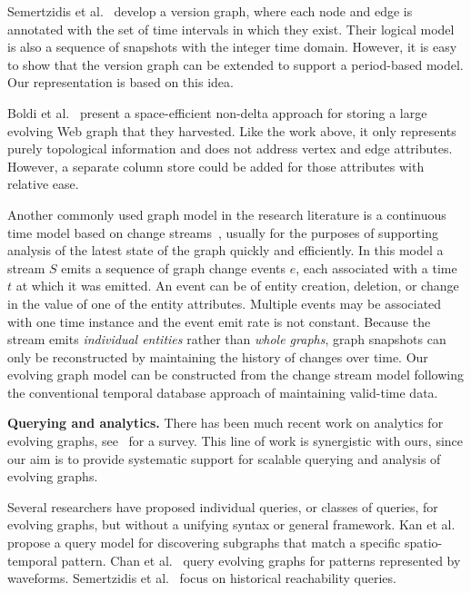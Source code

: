Semertzidis et al.~\cite{Semertzidis2015} develop a version graph,
where each node and edge is annotated with the set of time intervals
in which they exist.  Their logical model is also a sequence of
snapshots with the integer time domain.  However, it is easy to show
that the version graph can be extended to support a period-based
model.  Our \og representation is based on this idea.

Boldi et al.~\cite{Boldi2008} present a space-efficient non-delta
approach for storing a large evolving Web graph that they harvested.
Like the work above, it only represents purely topological information
and does not address vertex and edge attributes.  However, a separate
column store could be added for those attributes with relative ease.

Another commonly used graph model in the research literature is a
continuous time model based on change
streams~\cite{Cheng2012,Ediger2012}, usually for the purposes of
supporting analysis of the latest state of the graph quickly and
efficiently.  In this model a stream $S$ emits a sequence of graph
change events $e$, each associated with a time $t$ at which it was
emitted.  An event can be of entity creation, deletion, or change in
the value of one of the entity attributes.  Multiple events may be
associated with one time instance and the event emit rate is not
constant.  Because the stream emits {\em individual entities} rather
than {\em whole graphs}, graph snapshots can only be reconstructed by
maintaining the history of changes over time.  Our evolving graph
model can be constructed from the change stream model following
the conventional temporal database approach of maintaining valid-time data.


{\bf Querying and analytics.} There has been much recent work on
analytics for evolving graphs,
see~\cite{DBLP:journals/csur/AggarwalS14} for a survey. This line of
work is synergistic with ours, since our aim is to provide systematic
support for scalable querying and analysis of evolving graphs.

Several researchers have proposed individual queries, or classes of
queries, for evolving graphs, but without a unifying syntax or general
framework.  Kan et al.~\cite{Kan2009} propose a query model for
discovering subgraphs that match a specific spatio-temporal pattern.
Chan et al.~\cite{Chan2008} query evolving graphs for patterns
represented by waveforms.  Semertzidis et al.~\cite{Semertzidis2015}
focus on historical reachability queries.

